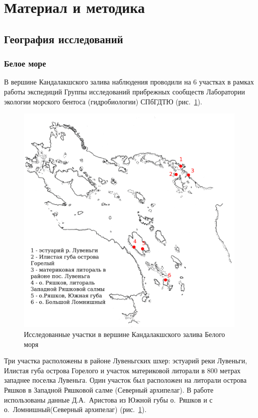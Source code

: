 \section{Материал и методика}
	\subsection{География исследований}

		\subsubsection{Белое море}
В вершине Кандалакшского залива наблюдения проводили на $6$ участках в рамках работы экспедиций Группы исследований прибрежных сообществ Лаборатории экологии морского бентоса (гидробиологии) СПбГДТЮ (рис.~\ref{ris:karta_Kandalaksha}). 
    \begin{figure}
    \includegraphics[width=\textwidth]{../maps/map_Kandalaksha.pdf}
    \caption{Исследованные участки в вершине Кандалакшского залива Белого моря}
    \label{ris:karta_Kandalaksha}
    \end{figure}
Три участка расположены в районе Лувеньгских шхер: эстуарий реки Лувеньги, Илистая губа острова Горелого и участок материковой литорали в 800 метрах западнее поселка Лувеньга.
Один участок был расположен на литорали острова Ряшков в Западной Ряшковой салме (Северный архипелаг).
В работе использованы данные Д.\:А.~Аристова из Южной губы о.~Ряшков и с о.~Ломнишный(Северный архипелаг) (рис.~\ref{ris:karta_Kandalaksha}). 

